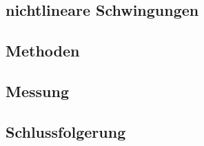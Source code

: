 \documentclass[11pt,a4paper,titlepage, ngerman]{article}
\begin{document}
		
			\subsection*{nichtlineare Schwingungen}
				
				
			\subsection*{Methoden}
				
			
			\subsection*{Messung}
				
				
			\subsection*{Schlussfolgerung}
				
				
\end{document}

